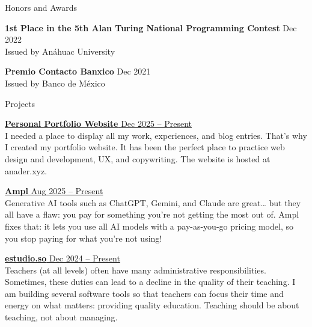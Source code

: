 \documentclass{resume} %
\begin{document}

\pagebreak
\begin{rSection}{ Honors and Awards }

{\bf 1st Place in the 5th Alan Turing National Programming Contest } \hfill {Dec 2022}
\\ 
Issued by Anáhuac University

{\bf Premio Contacto Banxico } \hfill {Dec 2021}
\\ 
Issued by Banco de México

\end{rSection}  


\begin{rSection}{ Projects }

\href{https://www.anader.xyz}{{\bf Personal Portfolio Website} \hfill {Dec 2025 -- Present}}
\\ 
I needed a place to display all my work, experiences, and blog entries. That's why I created my portfolio website. It has been the perfect place to practice web design and development, UX, and copywriting. The website is hosted at anader.xyz.

\href{https://ampl.xyz}{{\bf Ampl} \hfill {Aug 2025 -- Present}}
\\ 
Generative AI tools such as ChatGPT, Gemini, and Claude are great… but they all have a flaw: you pay for something you're not getting the most out of. Ampl fixes that: it lets you use all AI models with a pay-as-you-go pricing model, so you stop paying for what you're not using!

\href{https://estudio.so}{{\bf estudio.so} \hfill {Dec 2024 -- Present}}
\\ 
Teachers (at all levels) often have many administrative responsibilities. Sometimes, these duties can lead to a decline in the quality of their teaching. I am building several software tools so that teachers can focus their time and energy on what matters: providing quality education. Teaching should be about teaching, not about managing.

\end{rSection} 

\end{document}
